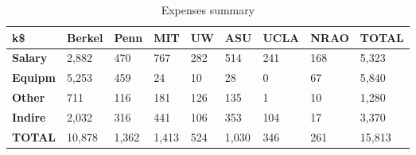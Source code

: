 

\begin{table}[h]
\centering
\label{tab:expenses}
\caption{Expenses summary}
\begin{tabular}{| p{0.5in} | p{.6in} |  p{.6in} |  p{.6in} |  p{.6in} |  p{.6in} |  p{.6in} |  p{.6in} |  p{.6in} | }\hline
  k\$   & \textbf{Berkel} & \textbf{Penn} & \textbf{MIT} & \textbf{UW} & \textbf{ASU} & \textbf{UCLA} & \textbf{NRAO} & \textbf{TOTAL}\\\hline
\textbf{Salary}&       2,882  &         470  &         767  &         282  &         514  &         241  &         168  &       5,323  \\\hline
\textbf{Equipm}&       5,253  &         459  &          24  &          10  &          28  &           0  &          67  &       5,840  \\\hline
\textbf{Other}&         711  &         116  &         181  &         126  &         135  &           1  &          10  &       1,280  \\\hline
\textbf{Indire}&       2,032  &         316  &         441  &         106  &         353  &         104  &          17  &       3,370  \\\hline
\textbf{TOTAL}&      10,878  &       1,362  &       1,413  &         524  &       1,030  &         346  &         261  &      15,813  \\\hline
\end{tabular}
\end{table}
